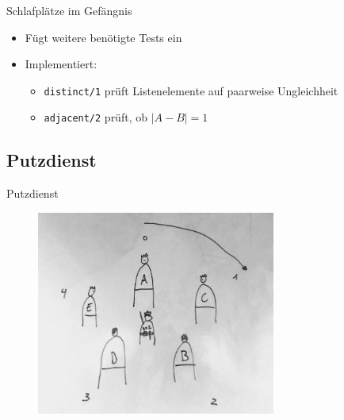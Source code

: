 \documentclass{beamer}
\begin{document}
\begin{frame}{Schlafplätze im Gefängnis}

	\begin{itemize}
		\item Fügt weitere benötigte Tests ein
		\item Implementiert:
		\begin{itemize}
			\item \texttt{distinct/1} prüft Listenelemente auf paarweise Ungleichheit
			\item \texttt{adjacent/2} prüft, ob $|A - B| = 1$
		\end{itemize}
	\end{itemize}
\end{frame}


\subsection{Putzdienst}

\begin{frame}{Putzdienst}
	\begin{figure}
		\includegraphics[width=0.7\textwidth]{images/putzdienst}
	\end{figure}
\end{frame}
\end{document}

